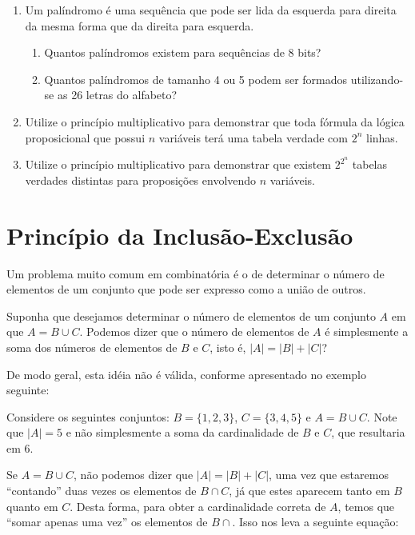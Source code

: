 \begin{enumerate}
\begin{enumerate}
     \end{enumerate}
     \item Um palíndromo é uma sequência que pode ser lida da esquerda
       para direita da mesma forma que da direita para esquerda.
     \begin{enumerate}
       \item Quantos palíndromos existem para sequências de 8 bits?
       \item Quantos palíndromos de tamanho 4 ou 5 podem ser formados
         utilizando-se as 26 letras do alfabeto?
     \end{enumerate}
     \item Utilize o princípio multiplicativo para demonstrar que toda
       fórmula da lógica proposicional que possui $n$ variáveis terá
       uma tabela verdade com $2^n$ linhas.
     \item Utilize o princípio multiplicativo para demonstrar que
       existem $2^{2^n}$ tabelas verdades distintas para proposições
       envolvendo $n$ variáveis.
\end{enumerate}

\section{Princípio da Inclusão-Exclusão}

Um problema muito comum em combinatória é o de determinar o número de
elementos de um conjunto que pode ser expresso como a união de outros.

Suponha que desejamos determinar o número de elementos de um conjunto
$A$ em que $A = B \cup C$. Podemos dizer que o número de elementos de
$A$ é simplesmente a soma dos números de elementos de  $B$
 e $C$, isto é, $|A| = |B| + |C|$?

De modo geral, esta idéia não é válida, conforme apresentado no
exemplo seguinte:

\begin{Example}
Considere os seguintes conjuntos: $B = \{1,2,3\}$, $C=\{3,4,5\}$ e $A
= B\cup C$. Note que $|A| = 5$ e não simplesmente a soma da
cardinalidade de $B$ e $C$, que resultaria em $6$.
\end{Example}

Se $A = B \cup C$, não podemos dizer que $|A| = |B| + |C|$, uma vez
que estaremos ``contando'' duas vezes os elementos de $B\cap C$, já
que estes aparecem tanto em $B$ quanto em $C$. Desta forma, para obter
a cardinalidade correta de $A$, temos que ``somar apenas uma vez'' os
elementos de $B\cap$. Isso nos leva a seguinte equação:

